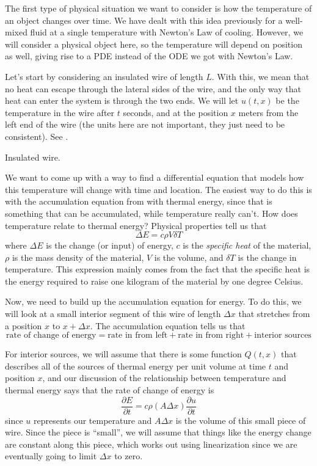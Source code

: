 The first type of physical situation we want to consider is how the temperature of an object changes over time. We have dealt with this idea previously for a well-mixed fluid at a single temperature with Newton's Law of cooling. However, we will consider a physical object here, so the temperature will depend on position as well, giving rise to a PDE instead of the ODE we got with Newton's Law.

Let's start by considering an insulated wire of length $L$. With this, we mean that no heat can escape through the lateral sides of the wire, and the only way that heat can enter the system is through the two ends. We will let $u(t,x)$ be the temperature in the wire after $t$ seconds, and at the position $x$ meters from the left end of the wire (the units here are not important, they just need to be consistent). See .

\begin{myfig}
\capstart
{}
\caption{Insulated wire.\label{heat:wirefig}}
\end{myfig}

We want to come up with a way to find a differential equation that models how this temperature will change with time and location. The easiest way to do this is with the accumulation equation from  with thermal energy, since that is something that can be accumulated, while temperature really can't. How does temperature relate to thermal energy? Physical properties tell us that 
\[ \Delta E = c \rho V \delta T \] where $\Delta E$ is the change (or input) of energy, $c$ is the \emph{specific heat} of the material, $\rho$ is the mass density of the material, $V$ is the volume, and $\delta T$ is the change in temperature. This expression mainly comes from the fact that the specific heat is the energy required to raise one kilogram of the material by one degree Celsius.

Now, we need to build up the accumulation equation for energy. To do this, we will look at a small interior segment of this wire of length $\Delta x$ that stretches from a position $x$ to $x + \Delta x$. The accumulation equation tells us that
\[ \text{rate of change of energy} = \text{rate in from left} + \text{rate in from right} + \text{interior sources} \] 

For interior sources, we will assume that there is some function $Q(t,x)$ that describes all of the sources of thermal energy per unit volume at time $t$ and position $x$, and our discussion of the relationship between temperature and thermal energy says that the rate of change of energy is
\[ \frac{\partial E}{\partial t} = c\rho (A\Delta x)\frac{\partial u}{\partial t} \] since $u$ represents our temperature and $A\Delta x$ is the volume of this small piece of wire. Since the piece is ``small'', we will assume that things like the energy change are constant along this piece, which works out using linearization since we are eventually going to limit $\Delta x$ to zero. 

